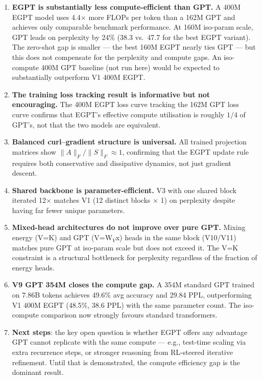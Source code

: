 \documentclass[11pt,a4paper]{article}
\begin{document}
\begin{enumerate}
  \item \textbf{EGPT is substantially less compute-efficient than GPT.}
    A 400M EGPT model uses 4.4$\times$ more FLOPs per token than a 162M GPT and achieves
    only comparable benchmark performance.  At 160M iso-param scale, GPT leads on perplexity
    by 24\% (38.3 vs.\ 47.7 for the best EGPT variant).  The zero-shot gap is smaller ---
    the best 160M EGPT nearly ties GPT --- but this does not compensate for the perplexity
    and compute gaps.  An iso-compute 400M GPT baseline (not run here) would be expected to
    substantially outperform V1 400M EGPT.
  \item \textbf{The training loss tracking result is informative but not encouraging.}
    The 400M EGPT loss curve tracking the 162M GPT loss curve confirms that EGPT's effective
    compute utilisation is roughly $1/4$ of GPT's, not that the two models are equivalent.
  \item \textbf{Balanced curl--gradient structure is universal.}
    All trained projection matrices show $\|A\|_F / \|S\|_F \approx 1$, confirming that
    the EGPT update rule requires both conservative and dissipative dynamics, not just
    gradient descent.
  \item \textbf{Shared backbone is parameter-efficient.}
    V3 with one shared block iterated 12$\times$ matches V1 (12 distinct blocks $\times$ 1)
    on perplexity despite having far fewer unique parameters.
  \item \textbf{Mixed-head architectures do not improve over pure GPT.}
    Mixing energy (V=K) and GPT (V=W$_V$x) heads in the same block (V10/V11) matches
    pure GPT at iso-param scale but does not exceed it.  The V=K constraint is
    a structural bottleneck for perplexity regardless of the fraction of energy heads.
  \item \textbf{V9 GPT 354M closes the compute gap.}
    A 354M standard GPT trained on 7.86B tokens achieves 49.6\% avg accuracy and 29.84
    PPL, outperforming V1 400M EGPT (48.5\%, 38.6 PPL) with the same parameter count.
    The iso-compute comparison now strongly favours standard transformers.
  \item \textbf{Next steps}: the key open question is whether EGPT offers any advantage
    GPT cannot replicate with the same compute --- e.g., test-time scaling via extra
    recurrence steps, or stronger reasoning from RL-steered iterative refinement.
    Until that is demonstrated, the compute efficiency gap is the dominant result.
\end{enumerate}
\end{document}
